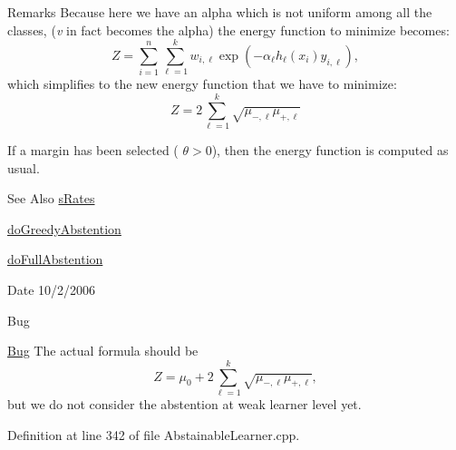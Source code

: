 \begin{DoxyRemark}{Remarks}
Because here we have an alpha which is not uniform among all the classes, ({\itshape v} in fact becomes the alpha) the energy function to minimize becomes\-: \[ Z = \sum_{i=1}^n \sum_{\ell=1}^k w_{i,\ell} \exp{ \left( -\alpha_\ell h_\ell(x_i) y_{i,\ell} \right) }, \] which simplifies to the new energy function that we have to minimize\-: \[ Z = 2 \sum_{\ell=1}^k \sqrt{ \mu_{-,\ell} \mu_{+,\ell} } \] 

If a margin has been selected ( $\theta > 0$), then the energy function is computed as usual. 
\end{DoxyRemark}
\begin{DoxySeeAlso}{See Also}
\hyperlink{structMultiBoost_1_1sRates}{s\-Rates} 

\hyperlink{classMultiBoost_1_1AbstainableLearner_a022edc8c1b04c21720f56c0562db10a7}{do\-Greedy\-Abstention} 

\hyperlink{classMultiBoost_1_1AbstainableLearner_a08b11f234d6f857343432a7f6c2d0c03}{do\-Full\-Abstention} 
\end{DoxySeeAlso}
\begin{DoxyDate}{Date}
10/2/2006 
\end{DoxyDate}
\begin{DoxyRefDesc}{Bug}
\item[\hyperlink{bug__bug000002}{Bug}]The actual formula should be \[ Z = \mu_0 + 2 \sum_{\ell=1}^k \sqrt{ \mu_{-,\ell} \mu_{+,\ell} }, \] but we do not consider the abstention at weak learner level yet. \end{DoxyRefDesc}


Definition at line 342 of file Abstainable\-Learner.\-cpp.

